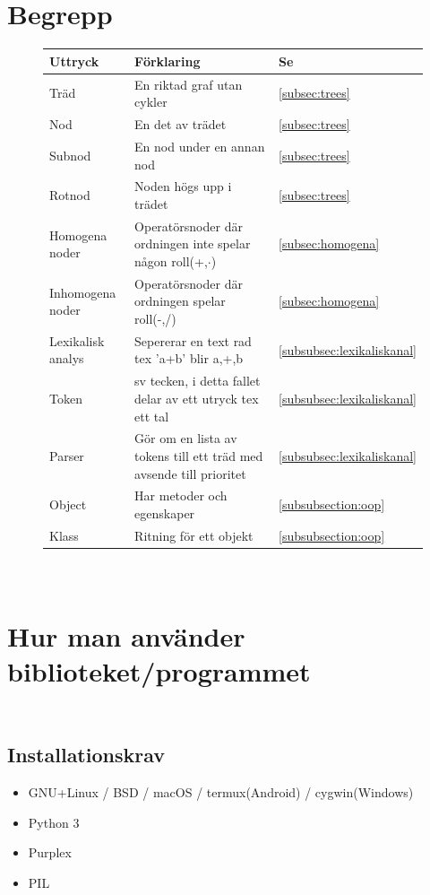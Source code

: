 \documentclass[12pt,a4paper]{article}
\begin{document}
\begin{appendices}
\section{\\Begrepp}
\begin{figure}[h!]
  \centering
  \begin{tabular}{l|l|l}
    \textbf{Uttryck} & \textbf{Förklaring} & \textbf{Se} \\
    \hline
    Träd & En riktad graf utan cykler & \ref{subsec:trees} \\
    Nod & En det av trädet & \ref{subsec:trees} \\
    Subnod & En nod under en annan nod & \ref{subsec:trees} \\
    Rotnod & Noden högs upp i trädet & \ref{subsec:trees} \\
    Homogena noder & Operatörsnoder där ordningen inte spelar någon roll(+,\(\cdot\)) & \ref{subsec:homogena} \\
    Inhomogena noder & Operatörsnoder där ordningen spelar roll(-,/) & \ref{subsec:homogena} \\
    Lexikalisk analys & Sepererar en text rad tex 'a+b' blir a,+,b & \ref{subsubsec:lexikaliskanal} \\
    Token & sv tecken, i detta fallet delar av ett utryck tex ett tal & \ref{subsubsec:lexikaliskanal} \\
    Parser & Gör om en lista av tokens till ett träd med avsende till prioritet & \ref{subsubsec:lexikaliskanal} \\
    Object & Har metoder och egenskaper & \ref{subsubsection:oop} \\
    Klass & Ritning för ett objekt & \ref{subsubsection:oop} \\
  \end{tabular}
\end{figure}
\section{\\Hur man använder biblioteket/programmet}
\subsection{\\Installationskrav}
\begin{itemize}
  \item GNU+Linux / BSD / macOS / termux(Android) / cygwin(Windows)
  \item Python 3
  \item Purplex
  \item PIL
\end{itemize}

\end{appendices}
\end{document}
